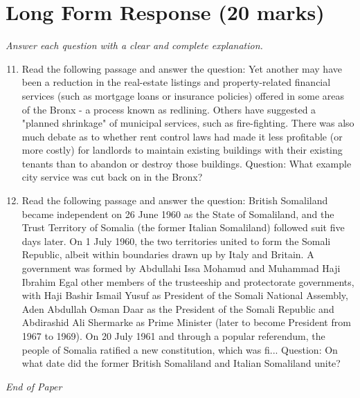 \documentclass[12pt]{article}
\begin{document}
\section*{Long Form Response (20 marks)}
\textit{Answer each question with a clear and complete explanation.}
\begin{enumerate}[label=\arabic*.]
\setcounter{enumi}{10}
\item Read the following passage and answer the question: Yet another may have been a reduction in the real-estate listings and property-related financial services (such as mortgage loans or insurance policies) offered in some areas of the Bronx - a process known as redlining. Others have suggested a "planned shrinkage" of municipal services, such as fire-fighting. There was also much debate as to whether rent control laws had made it less profitable (or more costly) for landlords to maintain existing buildings with their existing tenants than to abandon or destroy those buildings. Question: What example city service was cut back on in the Bronx?
\item Read the following passage and answer the question: British Somaliland became independent on 26 June 1960 as the State of Somaliland, and the Trust Territory of Somalia (the former Italian Somaliland) followed suit five days later. On 1 July 1960, the two territories united to form the Somali Republic, albeit within boundaries drawn up by Italy and Britain. A government was formed by Abdullahi Issa Mohamud and Muhammad Haji Ibrahim Egal other members of the trusteeship and protectorate governments, with Haji Bashir Ismail Yusuf as President of the Somali National Assembly, Aden Abdullah Osman Daar as the President of the Somali Republic and Abdirashid Ali Shermarke as Prime Minister (later to become President from 1967 to 1969). On 20 July 1961 and through a popular referendum, the people of Somalia ratified a new constitution, which was fi... Question: On what date did the former British Somaliland and Italian Somaliland unite?
\end{enumerate}

\vfill
\noindent\textit{End of Paper}
\end{document}
